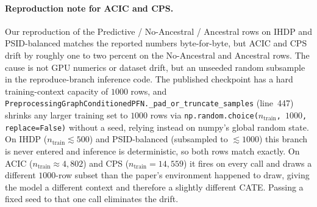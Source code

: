 \paragraph{Reproduction note for ACIC and CPS.}
Our reproduction of the Predictive / No-Ancestral / Ancestral rows on
IHDP and PSID-balanced matches the reported numbers byte-for-byte, but
ACIC and CPS drift by roughly one to two percent on the No-Ancestral
and Ancestral rows. The cause is not GPU numerics or dataset drift,
but an unseeded random subsample in the reproduce-branch inference
code. The published checkpoint has a hard training-context capacity of
$1000$ rows, and
\texttt{PreprocessingGraphConditionedPFN.\_pad\_or\_truncate\_samples}
(line~447) shrinks any larger training set to $1000$ rows via
\texttt{np.random.choice($n_\text{train}$, $1000$, replace=False)}
without a seed, relying instead on numpy's global random state. On
IHDP ($n_\text{train}\!\lesssim\!500$) and PSID-balanced (subsampled
to $\lesssim\!1000$) this branch is never entered and inference is
deterministic, so both rows match exactly. On ACIC
($n_\text{train}\!\approx\!4{,}802$) and CPS ($n_\text{train}\!=\!14{,}559$)
it fires on every call and draws a different $1000$-row subset than
the paper's environment happened to draw, giving the model a different
context and therefore a slightly different CATE. Passing a fixed seed
to that one call eliminates the drift.
